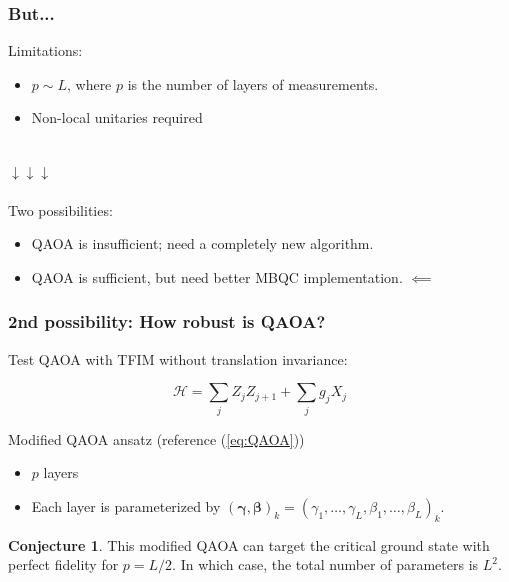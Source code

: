 \documentclass{beamer}
\theoremstyle{definition}
\newtheorem{conjecture}{Conjecture}[section]
\begin{document}


\begin{frame}
\frametitle{But...}
Limitations: 
\begin{itemize}
	\item $p \sim L$, where $p$ is the number of layers of measurements. 
	\item Non-local unitaries required
\end{itemize}




$\,$\\
\pause
$\downarrow\downarrow\downarrow$\\

$\,$\\

Two possibilities:
\begin{itemize}
	\item QAOA is insufficient; need a completely new algorithm.
	\item QAOA is sufficient, but need better MBQC implementation. \pause $\impliedby$
\end{itemize} 



\end{frame}






\begin{frame}
\frametitle{2nd possibility: How robust is QAOA?}

Test QAOA with TFIM without translation invariance:

\begin{equation}\label{eq:QAOAmod}
\mathcal{H} = \sum_{j} Z_j Z_{j+1} + \sum_j g_j  X_j
\end{equation}

\pause

Modified QAOA ansatz (reference (\ref{eq:QAOA}))
\begin{itemize}
	\item $p$ layers
	\item Each layer is parameterized by $(\bm\gamma,\bm\beta)_k = (\gamma_{1},\dots,\gamma_{L},\beta_{1},\dots,\beta_{L} )_k$.
\end{itemize}

\pause

\begin{conjecture}
	This modified QAOA can target the critical ground state with perfect fidelity for $p = L/2$. In which case, the total number of parameters is $L^2$.  
\end{conjecture}




\end{frame}
\end{document}
